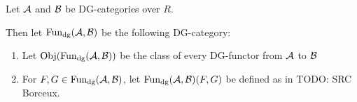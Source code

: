 \begin{definition}[\( \Fun_{\dg}(\Ac, \Bc) \)]
    \label{def:dg_functor_category}
    Let \( {\mathcal{A}} \) and \( {\mathcal{B}} \) be DG-categories over \( R \).

    Then let \( \Fun_{\dg}(\Ac, \Bc) \) be the following DG-category:
    \begin{enumerate}
        \item{
            Let \( \operatorname{Obj}(\operatorname{Fun}_{\operatorname{dg}}({\mathcal{A}}, {\mathcal{B}})) \) be the class of every DG-functor from \( {\mathcal{A}} \) to \( {\mathcal{B}} \)
        }
        \item{
            For \( F, G \in \operatorname{Fun}_{\operatorname{dg}}({\mathcal{A}}, {\mathcal{B}}) \), let \( \operatorname{Fun}_{\operatorname{dg}}({\mathcal{A}}, {\mathcal{B}})(F, G) \) be defined as in TODO: SRC Borceux.
            



}
\end{enumerate}
\end{definition}
